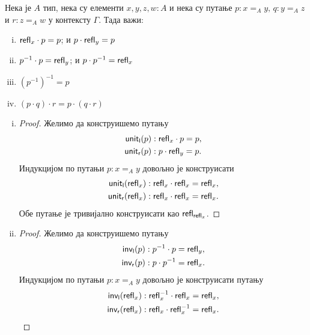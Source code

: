 \documentclass[12pt,oneside]{memoir}
\begin{document}
\begin{lemma}
    \label{lmm:inftygrupoid}
    Нека је $A$ тип, нека су елементи $x, y, z, w : A$ и нека су путање $p : x =_A y,\, q : y =_A z$ и $r : z =_A w$ у контексту $\Gamma$. Тада важи:
    \begin{enumerate}[(i)]
        \item $\mathsf{refl}_{x} \cdot p = p$; и $p \cdot \mathsf{refl}_{y} = p$
        \item $p^{-1} \cdot p = \mathsf{refl}_{y}$; и $p \cdot p^{-1} = \mathsf{refl}_{x}$
        \item $(p^{-1})^{-1} = p$
        \item $(p \cdot q) \cdot r = p \cdot (q \cdot r)$
    \end{enumerate}
\end{lemma}
\begin{enumerate}[(i)]
    \item 
    \begin{proof}
        Желимо да конструишемо путању
        \begin{align*}
            \mathsf{unit_l}(p) &: \mathsf{refl}_{x} \cdot p = p, \\
            \mathsf{unit_r}(p) &: p \cdot \mathsf{refl}_{y} = p. \\
        \end{align*} 
        Индукцијом по путањи $p : x =_A y$ довољно је конструисати
        \begin{align*}
            \mathsf{unit_l}(\mathsf{refl}_{x}) &: \mathsf{refl}_{x} \cdot \mathsf{refl}_{x} = \mathsf{refl}_{x}, \\
            \mathsf{unit_r}(\mathsf{refl}_{x}) &: \mathsf{refl}_{x} \cdot \mathsf{refl}_{x} = \mathsf{refl}_{x}.
        \end{align*} 
        Обе путање је тривијално конструисати као $\mathsf{refl}_{\mathsf{refl}_{x}}$.
    \end{proof}
    \item 
    \begin{proof}
        Желимо да конструишемо путању
        \begin{align*}
            \mathsf{inv_l}(p) &: p^{-1} \cdot p = \mathsf{refl}_{y}, \\
            \mathsf{inv_r}(p) &: p \cdot p^{-1} = \mathsf{refl}_{x}.
        \end{align*}
        Индукцијом по путањи $p : x =_A y$ довољно је конструисати путању
        \begin{align*}
            \mathsf{inv_l}(\refl{x}) &: \refl{x}^{-1} \cdot \refl{x} = \refl{x}, \\
            \mathsf{inv_r}(\refl{x}) &: \refl{x} \cdot \refl{x}^{-1} = \refl{x}.

\end{align*}
\end{proof}
\end{enumerate}
\end{document}
